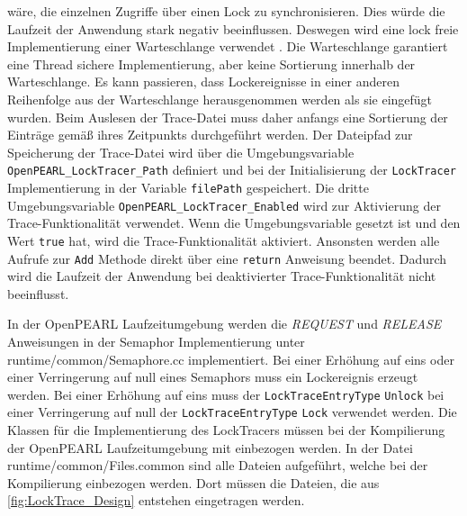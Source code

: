 wäre, die einzelnen Zugriffe über einen Lock zu synchronisieren. Dies würde die
Laufzeit der Anwendung stark negativ beeinflussen. Deswegen wird eine lock freie
Implementierung einer Warteschlange verwendet
\autocite{Moody_Camels_Concurrentqueue}. Die Warteschlange garantiert eine
Thread sichere Implementierung, aber keine Sortierung innerhalb der
Warteschlange. Es kann passieren, dass Lockereignisse in einer anderen
Reihenfolge aus der Warteschlange herausgenommen werden als sie eingefügt
wurden. Beim Auslesen der Trace-Datei muss daher anfangs eine Sortierung der
Einträge gemäß ihres Zeitpunkts durchgeführt werden. Der Dateipfad zur
Speicherung der Trace-Datei wird über die Umgebungsvariable
\texttt{OpenPEARL\_LockTracer\_Path} definiert und bei der Initialisierung der
\texttt{LockTracer} Implementierung in der Variable \texttt{filePath}
gespeichert. Die dritte Umgebungsvariable
\texttt{OpenPEARL\_LockTracer\_Enabled} wird zur Aktivierung der
Trace-Funktionalität verwendet. Wenn die Umgebungsvariable gesetzt ist und den
Wert \texttt{true} hat, wird die Trace-Funktionalität aktiviert. Ansonsten
werden alle Aufrufe zur \texttt{Add} Methode direkt über eine \texttt{return}
Anweisung beendet. Dadurch wird die Laufzeit der Anwendung bei deaktivierter
Trace-Funktionalität nicht beeinflusst.

In der OpenPEARL Laufzeitumgebung werden die \emph{REQUEST} und \emph{RELEASE}
Anweisungen in der Semaphor Implementierung unter runtime/common/Semaphore.cc
implementiert. Bei einer Erhöhung auf eins oder einer Verringerung auf null
eines Semaphors muss ein Lockereignis erzeugt werden. Bei einer Erhöhung auf
eins muss der \texttt{LockTraceEntryType} \texttt{Unlock} bei einer Verringerung
auf null der \texttt{LockTraceEntryType} \texttt{Lock} verwendet werden. Die
Klassen für die Implementierung des LockTracers müssen bei der Kompilierung der
OpenPEARL Laufzeitumgebung mit einbezogen werden. In der Datei
runtime/common/Files.common sind alle Dateien aufgeführt, welche bei der
Kompilierung einbezogen werden. Dort müssen die Dateien, die aus
\cref{fig:LockTrace_Design} entstehen eingetragen werden.

